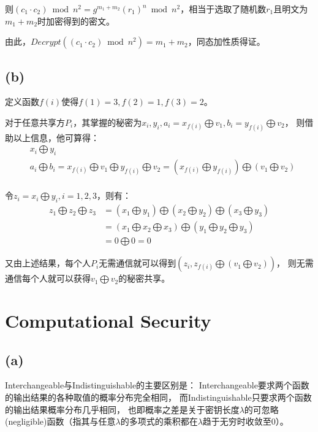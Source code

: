 \documentclass[twoside,11pt]{article}
\begin{document}
则$(c_1 \cdot c_2) \bmod{n^2}=g^{m_1+m_2} (r_1)^{n} \bmod{n^2}$，相当于选取了随机数$r_1$且明文为$m_1+m_2$时加密得到的密文。

由此，$Decrypt( (c_1 \cdot c_2) \bmod{n^2} ) =m_1+m_2$，同态加性质得证。

\subsection*{(b)}
定义函数$f(i)$使得$f(1)=3, f(2)=1, f(3)=2$。

对于任意共享方$P_i$，其掌握的秘密为$x_i, y_i, a_i=x_{f(i)} \bigoplus v_1, b_i=y_{f(i)} \bigoplus v_2$，
则借助以上信息，他可算得：
\begin{align*}
     & x_i \bigoplus y_i                                                              \\
     & a_i \bigoplus b_i =  x_{f(i)} \bigoplus v_1 \bigoplus y_{f(i)} \bigoplus v_2 =
    (x_{f(i)} \bigoplus y_{f(i)}) \bigoplus (v_1 \bigoplus v_2)                       \\
\end{align*}

令$z_i = x_i \bigoplus y_i, i=1,2,3$，则有：
\begin{align*}
    z_1 \bigoplus z_2 \bigoplus z_3 & = (x_1 \bigoplus y_1) \bigoplus (x_2 \bigoplus y_2) \bigoplus (x_3 \bigoplus y_3) \\
                                    & = (x_1 \bigoplus x_2 \bigoplus x_3) \bigoplus (y_1 \bigoplus y_2 \bigoplus y_3)   \\
                                    & = 0 \bigoplus 0 = 0
\end{align*}

又由上述结果，每个人$P_i$无需通信就可以得到$(z_i, z_{f(i)} \bigoplus (v_1 \bigoplus v_2))$，
则无需通信每个人就可以获得$v_1 \bigoplus v_2$的秘密共享。


\section{Computational Security}
\subsection*{(a)}
Interchangeable与Indistinguishable的主要区别是：
Interchangeable要求两个函数的输出结果的各种取值的概率分布完全相同，
而Indistinguishable只要求两个函数的输出结果概率分布几乎相同，
也即概率之差是关于密钥长度$\lambda$的可忽略(negligible)函数（指其与任意$\lambda$的多项式的乘积都在$\lambda$趋于无穷时收敛至0）。
\end{document}
